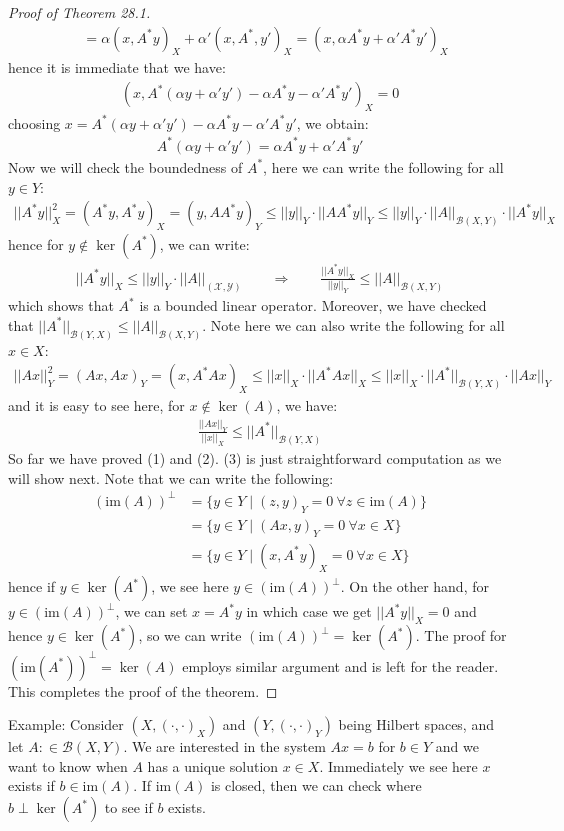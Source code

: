 \documentclass[11pt]{book}
\theoremstyle{break}
\theoremstyle{break}
\newcommand{\im}{\text{im}}
\newcommand{\example}{\color{green}Example: \color{black}}
\begin{document}
\begin{proof}[Proof of Theorem 28.1]
\begin{align*}
&= \alpha(x,A^*y)_X + \alpha' (x,A^*,y')_X  = (x,\alpha A^*y+\alpha' A^* y')_X
\end{align*}
hence it is immediate that we have:
\begin{align*}
(x,A^*(\alpha y + \alpha' y') - \alpha A^* y - \alpha' A^* y')_X = 0
\end{align*}
choosing $x = A^*(\alpha y + \alpha' y') - \alpha A^* y - \alpha' A^* y'$, we obtain:
\begin{align*}
A^*(\alpha y + \alpha' y') = \alpha A^* y + \alpha' A^* y'
\end{align*}
Now we will check the boundedness of $A^*$, here we can write the following for all $y \in Y$:
\begin{align*}
||A^*y||^2_X = (A^*y , A^* y)_X = (y, AA^* y)_Y \leq ||y||_Y\cdot ||AA^* y||_Y \leq ||y||_Y\cdot ||A||_{\mathcal{B}(X,Y)}\cdot ||A^* y||_X
\end{align*}
hence for $y \notin \ker(A^*)$, we can write:
\begin{align*}
||A^* y||_X \leq ||y||_Y \cdot ||A||_{\mathcal{(X,Y)}} \qquad \Rightarrow \qquad \frac{||A^* y||_X}{||y||_Y} \leq ||A||_{\mathcal{B}(X,Y)}
\end{align*}
which shows that $A^*$ is a bounded linear operator. Moreover, we have checked that $||A^*||_{\mathcal{B}(Y,X)} \leq ||A||_{\mathcal{B}(X,Y)}$. Note here we can also write the following for all $x \in X$:
\begin{align*}
||Ax||_Y^2 = (Ax,Ax)_Y = (x,A^*Ax)_X \leq ||x||_X\cdot ||A^*Ax||_X \leq ||x||_X \cdot||A^*||_{\mathcal{B}(Y,X)}\cdot ||Ax||_Y
\end{align*}
and it is easy to see here, for $x \notin \ker(A)$, we have:
\begin{align*}
\frac{||Ax||_Y}{||x||_X} \leq ||A^*||_{\mathcal{B}(Y,X)}
\end{align*}
So far we have proved (1) and (2). (3) is just straightforward computation as we will show next. Note that we can write the following:
\begin{align*}
(\im(A))^\perp &= \{ y \in Y \mid (z,y)_Y = 0\ \forall z \in \im(A)\}\\
&= \{ y \in Y \mid (Ax, y)_Y = 0\ \forall x \in X\}\\
&= \{ y\in Y \mid (x,A^* y)_X = 0\ \forall x \in X\}
\end{align*}
hence if $y \in \ker(A^*)$, we see here $y \in (\im(A))^\perp$. On the other hand, for $y \in (\im(A))^\perp$, we can set $x = A^*y$ in which case we get $||A^*y||_X = 0$ and hence $y \in \ker(A^*)$, so we can write $(\im(A))^\perp = \ker(A^*)$. The proof for $(\im(A^*))^{\perp} = \ker(A)$ employs similar argument and is left for the reader. This completes the proof of the theorem. 
\end{proof}
\example Consider $(X,(\cdot,\cdot)_X)$ and $(Y,(\cdot,\cdot)_Y)$ being Hilbert spaces, and let $A:\in \mathcal{B}(X,Y)$. We are interested in the system $Ax = b$ for $b \in Y$ and we want to know when $A$ has a unique solution $x \in X$. Immediately we see here $x$ exists if $b \in \im(A)$. If $\im(A)$ is closed, then we can check where $b \perp \ker(A^*)$ to see if $b$ exists. 
\end{document}
